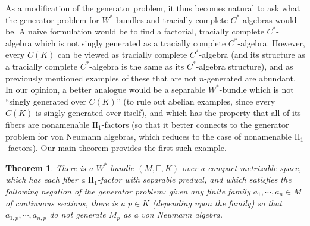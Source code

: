 \documentclass[10pt]{amsart}
\newtheorem{thm}{Theorem}[section]
\theoremstyle{definition}
\numberwithin{equation}{section}
\newcommand{\bE}{{\mathbb E}}
\begin{document}
As a modification of the generator problem, it thus becomes natural to ask what the generator problem for $W^{*}$-bundles and tracially complete $C^{*}$-algebras would be. A naive formulation would be to find a factorial, tracially complete $C^{*}$-algebra which is not singly generated as a tracially complete $C^{*}$-algebra. However, every $C(K)$ can be viewed as tracially complete $C^{*}$-algebra (and its structure as a tracially complete $C^{*}$-algebra is the same as its $C^{*}$-algebra structure), and as previously mentioned examples of these that are not $n$-generated are abundant. In our opinion, a better analogue would be a separable $W^{*}$-bundle which is not ``singly generated over $C(K)$'' (to rule out abelian examples, since every $C(K)$ is singly generated over itself), and which has the property that all of its fibers are nonamenable $\textrm{II}_{1}$-factors (so that it better connects to the generator problem for von Neumann algebras, which reduces to the case of nonamenable $\textrm{II}_{1}$-factors). Our main theorem provides the first such example.

\begin{thm}\label{thm: kind of main thm}
There is a $W^{*}$-bundle $(M,\bE,K)$ over a compact metrizable space, which has each fiber a $\textrm{II}_{1}$-factor with separable predual, and which satisfies the following  negation of the generator problem: given any finite family $a_{1},\cdots,a_{n}\in M$ of continuous sections, there is a $p\in K$ (depending upon the family) so that $a_{1,p},\cdots,a_{n,p}$ do not generate $M_{p}$ as a von Neumann algebra.    
\end{thm}
\end{document}

